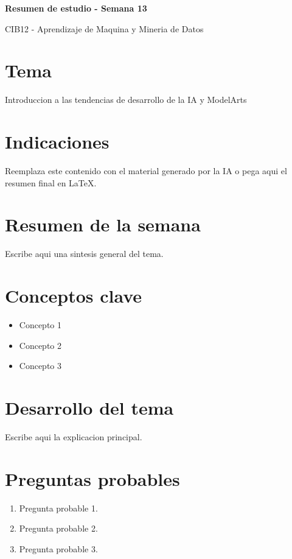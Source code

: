 \documentclass[8pt,a4paper,twocolumn]{article}
\newcommand{\resumentitulo}{Resumen de estudio - Semana 13}
\begin{document}
\vspace*{-1.0em}
\begin{tcolorbox}[colback=black!12,colframe=black!35,boxrule=0.3pt,arc=1pt,left=4pt,right=4pt,top=3pt,bottom=3pt]
{\bfseries\normalsize \resumentitulo\par}
{\scriptsize CIB12 - Aprendizaje de Maquina y Mineria de Datos\par}
\end{tcolorbox}
\vspace{0.15em}

\section*{Tema}
Introduccion a las tendencias de desarrollo de la IA y ModelArts

\section*{Indicaciones}
Reemplaza este contenido con el material generado por la IA o pega aqui el resumen final en LaTeX.

\section*{Resumen de la semana}
Escribe aqui una sintesis general del tema.

\section*{Conceptos clave}
\begin{itemize}
    \item Concepto 1
    \item Concepto 2
    \item Concepto 3
\end{itemize}

\section*{Desarrollo del tema}
Escribe aqui la explicacion principal.

\section*{Preguntas probables}
\begin{enumerate}
    \item Pregunta probable 1.
    \item Pregunta probable 2.
    \item Pregunta probable 3.
\end{enumerate}
\end{document}
